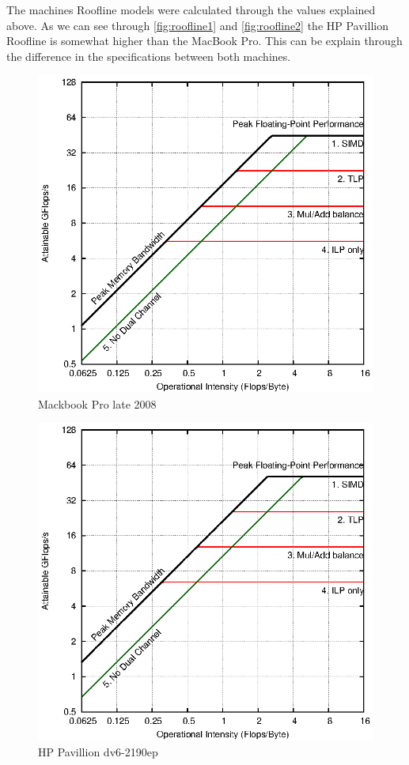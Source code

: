 \documentclass[twoside]{article}
\begin{document}
\begin{multicols}{2}
The machines Roofline models were calculated through the values explained above. As we can see through \autoref{fig:roofline1} and \autoref{fig:roofline2} the HP Pavillion Roofline is somewhat higher than the MacBook Pro. This can be explain through the difference in the specifications between both machines.
\begin{figure}[!htp]
	\centering
		\includegraphics[width=\textwidth]{images/roofline_mbp.eps}
		\caption{Mackbook Pro late 2008 \label{fig:roofline1}}
\end{figure}
\begin{figure}[!htp]
	\centering
		\includegraphics[width=\textwidth]{images/roofline_hp.eps}
		\caption{HP Pavillion dv6-2190ep \label{fig:roofline2}}
\end{figure}


\end{multicols}
\end{document}
